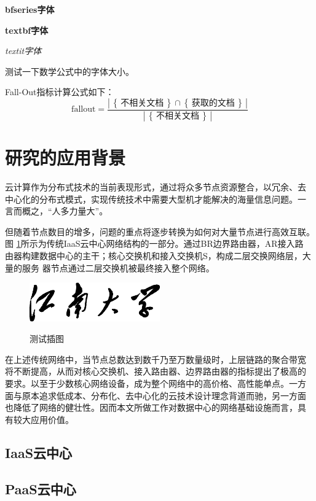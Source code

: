 {\bfseries bfseries字体}

{\textbf{textbf字体}}

{\textit{textit字体}}

测试一下数学公式中的字体大小。

\newcommand{\set}[1]{\left\{\,#1\,\right\}}
\newcommand{\card}[1]{\left|\,#1\,\right|}

Fall-Out指标计算公式如下：
\begin{equation*}
  \mbox{fallout} = \frac{\card{\set{\text{不相关文档}}\cap\set{\text{获取的文档}}}}{\card{\set{\text{不相关文档}}}}
\end{equation*}

\section{研究的应用背景}
云计算作为分布式技术的当前表现形式，通过将众多节点资源整合，以冗余、去
中心化的分布式模式，实现传统技术中需要大型机才能解决的海量信息问题。一
言而概之，“人多力量大”。

但随着节点数目的增多，问题的重点将逐步转换为如何对大量节点进行高效互联。图
\ref{fig:test1}所示为传统IaaS云中心网络结构的一部分。通过BR边界路由器，AR接入路
由器构建数据中心的主干；核心交换机和接入交换机S，构成二层交换网络层，大量的服务
器节点通过二层交换机被最终接入整个网络。
\begin{figure}[htbp]
  \centering
  \includegraphics[width= 0.5\textwidth]{jnuname.eps}\\
  \caption{测试插图}\label{fig:test1}
\end{figure}
在上述传统网络中，当节点总数达到数千乃至万数量级时，上层链路的聚合带宽
将不断提高，从而对核心交换机、接入路由器、边界路由器的指标提出了极高的
要求。以至于少数核心网络设备，成为整个网络中的高价格、高性能单点。一方
面与原本追求低成本、分布化、去中心化的云技术设计理念背道而驰，另一方面
也降低了网络的健壮性。因而本文所做工作对数据中心的网络基础设施而言，具
有较大应用价值。
\subsection{IaaS云中心}
\Blindtext
\subsection{PaaS云中心}
\Blindtext
